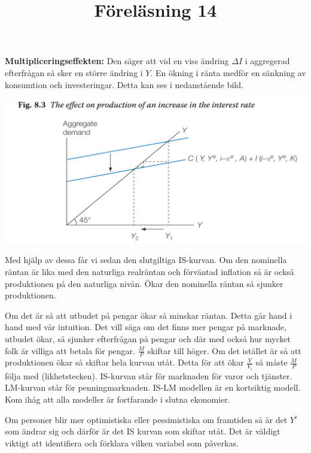 \documentclass{article}
\begin{document}
\textbf{Multipliceringseffekten:} Den säger att vid en viss ändring $ \Delta I$ i aggregerad efterfrågan så sker en större ändring i $ Y$. En ökning i ränta medför en sänkning av konsumtion och investeringar. Detta kan ses i nedanstående bild. 

\includegraphics[scale=0.5]{skarm7} \vspace{5mm} \par \noindent 
Med hjälp av dessa får vi sedan den slutgiltiga IS-kurvan. Om den nominella räntan är lika med den naturliga realräntan och förväntad inflation så är också produktionen på den naturliga nivån. Ökar den nominella räntan så sjunker produktionen. \vspace{5mm} \par \noindent  Om det är så att utbudet på pengar ökar så minskar räntan. Detta går hand i hand med vår intuition. Det vill säga om det finns mer pengar på marknade, utbudet ökar, så sjunker efterfrågan på pengar och där med också hur mycket folk är villiga att betala för pengar. $\frac{M}{P}$ skiftar till höger. Om det istället är så att produktionen ökar så skiftar hela kurvan utåt. Detta för att ökar $\frac{Y}{V_i}$ så måste $\frac{M}{P}$ följa med (likhetstecken). IS-kurvan står för marknaden för varor och tjänster. LM-kurvan står för penningmarknaden. IS-LM modellen är en kortsiktig modell. Kom ihåg att alla modeller är fortfarande i slutna ekonomier. \vspace{5mm} \par \noindent Om personer blir mer optimistiska eller pessimistiska om framtiden så är det $ Y^e$ som ändrar sig och därför är det IS kurvan som skiftar utåt. Det är väldigt viktigt att identifiera och förklara vilken variabel som påverkas. 

\vspace{5mm}
\title{Föreläsning 14}
\vspace{5mm} \par \noindent 
\end{document}
